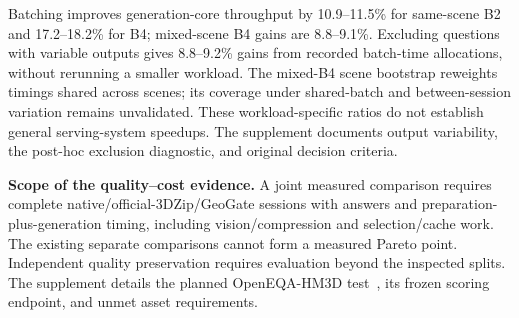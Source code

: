 Batching improves generation-core throughput by 10.9--11.5\% for same-scene B2 and 17.2--18.2\% for B4; mixed-scene B4 gains are 8.8--9.1\%. Excluding questions with variable outputs gives 8.8--9.2\% gains from recorded batch-time allocations, without rerunning a smaller workload. The mixed-B4 scene bootstrap reweights timings shared across scenes; its coverage under shared-batch and between-session variation remains unvalidated. These workload-specific ratios do not establish general serving-system speedups. The supplement documents output variability, the post-hoc exclusion diagnostic, and original decision criteria.

\textbf{Scope of the quality--cost evidence.} A joint measured comparison requires complete native/official-3DZip/GeoGate sessions with answers and preparation-plus-generation timing, including vision/compression and selection/cache work. The existing separate comparisons cannot form a measured Pareto point. Independent quality preservation requires evaluation beyond the inspected splits. The supplement details the planned OpenEQA-HM3D test~\cite{majumdar2024openeqa}, its frozen scoring endpoint, and unmet asset requirements.
